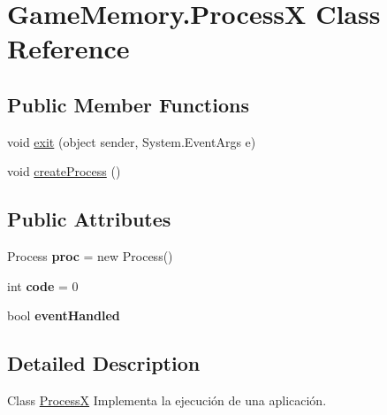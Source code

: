 \hypertarget{class_game_memory_1_1_process_x}{\section{Game\-Memory.\-Process\-X Class Reference}
\label{class_game_memory_1_1_process_x}
}
\subsection*{Public Member Functions}
\begin{DoxyCompactItemize}
\item 
void \hyperlink{class_game_memory_1_1_process_x_a439422b847a7c6e9cffb1fe6e1bac97b}{exit} (object sender, System.\-Event\-Args e)
\item 
void \hyperlink{class_game_memory_1_1_process_x_af546d1988616421a0ef71d8a690f48ae}{create\-Process} ()
\end{DoxyCompactItemize}
\subsection*{Public Attributes}
\begin{DoxyCompactItemize}
\item 
\hypertarget{class_game_memory_1_1_process_x_a5872fb963960cb55b88672359e304fd9}{Process {\bfseries proc} = new Process()}\label{class_game_memory_1_1_process_x_a5872fb963960cb55b88672359e304fd9}

\item 
\hypertarget{class_game_memory_1_1_process_x_a0df5c9fb3941a4dadfb00ef605f48f59}{int {\bfseries code} = 0}\label{class_game_memory_1_1_process_x_a0df5c9fb3941a4dadfb00ef605f48f59}

\item 
\hypertarget{class_game_memory_1_1_process_x_a1b13893290b37c12e9612065d27637f2}{bool {\bfseries event\-Handled}}\label{class_game_memory_1_1_process_x_a1b13893290b37c12e9612065d27637f2}

\end{DoxyCompactItemize}


\subsection{Detailed Description}
Class \hyperlink{class_game_memory_1_1_process_x}{Process\-X} Implementa la ejecución de una aplicación. 

